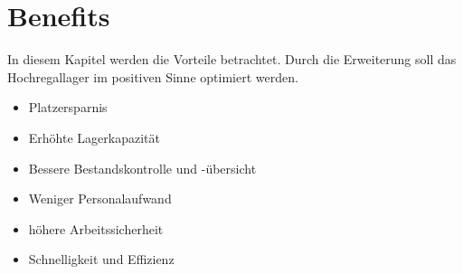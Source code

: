 \chapter{Benefits}
In diesem Kapitel werden die Vorteile betrachtet. Durch die Erweiterung soll das Hochregallager im positiven Sinne  optimiert werden.
\begin{itemize}
	\item Platzersparnis
	
	\item Erhöhte Lagerkapazität
	\item Bessere Bestandskontrolle und -übersicht
	\item Weniger Personalaufwand
	\item höhere Arbeitssicherheit
	\item Schnelligkeit und Effizienz
\end{itemize}